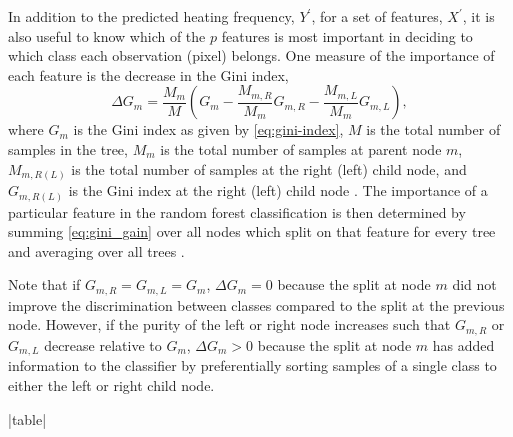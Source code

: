 In addition to the predicted heating frequency, $Y^\prime$, for a set of features, $X^\prime$, it is also useful to know which of the $p$ features is most important in deciding to which class each observation (pixel) belongs.
One measure of the importance of each feature is the decrease in the Gini index,
\begin{equation}\label{eq:gini_gain}
    \Delta G_m = \frac{M_m}{M}\left( G_m - \frac{M_{m,R}}{M_m}G_{m,R} - \frac{M_{m,L}}{M_m}G_{m,L} \right),
\end{equation}
where $G_m$ is the Gini index as given by \autoref{eq:gini-index}, $M$ is the total number of samples in the tree, $M_m$ is the total number of samples at parent node $m$, $M_{m,R(L)}$ is the total number of samples at the right (left) child node, and $G_{m,R(L)}$ is the Gini index at the right (left) child node \citep{sandri_bias_2008}.
The importance of a particular feature in the random forest classification is then determined by summing \autoref{eq:gini_gain} over all nodes which split on that feature for every tree and averaging over all trees \citep{breiman_classification_1984}.

Note that if $G_{m,R}=G_{m,L}=G_m$, $\Delta G_m=0$ because the split at node $m$ did not improve the discrimination between classes compared to the split at the previous node.
However, if the purity of the left or right node increases such that $G_{m,R}$ or $G_{m,L}$ decrease relative to $G_m$, $\Delta G_m > 0$ because the split at node $m$ has added information to the classifier by preferentially sorting samples of a single class to either the left or right child node.

\py[manager_ml]|table|

